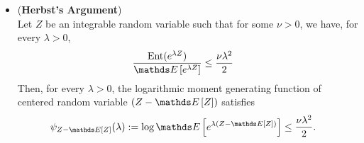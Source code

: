 \documentclass[11pt]{article}
\begin{document}
\begin{itemize}
\item \begin{proposition} (\textbf{Herbst's Argument}) \citep{boucheron2013concentration, wainwright2019high}\\
Let $Z$ be an integrable random variable such that for some $\nu > 0$, we have, for every $\lambda > 0$,
\begin{align}
\frac{\text{Ent}(e^{\lambda Z})}{\E{}{e^{\lambda Z}}} &\le \frac{\nu \lambda^2}{2} \label{ineqn: herbst_argument}
\end{align} Then, for every $\lambda >0$, the logarithmic moment generating function of centered random variable $(Z - \E{}{Z})$ satisfies
\begin{align*}
\psi_{Z - \E{}{Z}}(\lambda) := \log\E{}{e^{\lambda (Z - \E{}{Z})}} &\le \frac{\nu \lambda^2}{2} .
\end{align*}
\end{proposition}
\end{itemize}
\end{document}
